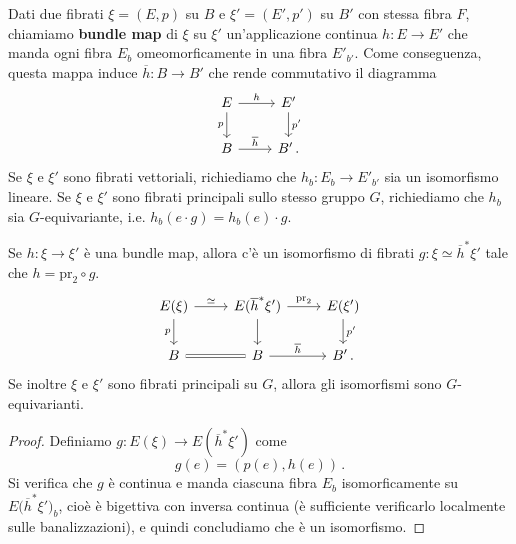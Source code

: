 
\begin{df}
	Dati due fibrati $\xi = (E,p)$ su $B$ e  $\xi'=(E',p')$ su $B'$ con stessa fibra $F$,
	chiamiamo \textbf{bundle map} di $\xi$ su $\xi'$ un'applicazione continua
	$h:E \to E'$ che manda ogni fibra $E_{b}$ omeomorficamente in una fibra $E'_{b'}$.
	Come conseguenza, questa mappa induce $\overline{h} : B \to B'$ che rende commutativo il diagramma
	\begin{equation*}
		\begin{tikzcd}
			E \ar[d, "p"'] \ar[r, "h"] & E' \ar[d, "p'"] \\
			B \ar[r, "\overline{h}"] & B'\,.
		\end{tikzcd}
	\end{equation*}
	Se $\xi$ e $\xi'$ sono fibrati vettoriali, richiediamo che
	$h_{b}:E_{b} \to E'_{b'}$ sia un isomorfismo lineare.
	Se $\xi$ e $\xi'$ sono fibrati principali sullo stesso gruppo $G$,
	richiediamo che $h_{b}$ sia $G$-equivariante, i.e. $h_{b}(e \cdot g) = h_{b}(e) \cdot g$.
\end{df}


\begin{prop}\label{bundle-map-pullback}
	Se $h:\xi \to \xi'$ è una bundle map,
	allora c'è un isomorfismo di fibrati $g:\xi \simeq \overline{h}^{*}\xi'$
	tale che $h=\mathrm{pr}_{2} \circ g$.
	\begin{equation*}
		\begin{tikzcd}
			E(\xi) \ar[r, "\simeq"] \ar[d, "p"']
			& E(\overline{h}^{*}\xi') \ar[r, "\mathrm{pr}_{2}"] \ar[d]
			& E(\xi') \ar[d, "p'"] \\
			B \ar[r, equals] 
			& B \ar[r, "\overline{h}"]
			& B'\,.
		\end{tikzcd}
	\end{equation*}
	Se inoltre $\xi$ e $\xi'$ sono fibrati principali su $G$,
	allora gli isomorfismi sono $G$-equivarianti.
	\begin{proof}
		Definiamo $g: E(\xi) \to E(\overline{h}^{*}\xi')$ come
		\begin{equation*}
			g(e) = \left( p(e), h(e) \right)\,.
		\end{equation*}
		Si verifica che $g$ è continua e manda ciascuna fibra $E_{b}$
		isomorficamente su %
		$E({\overline{h}^{*}\xi')_{b}}$,
		cioè è bigettiva con inversa continua (è sufficiente verificarlo
		localmente sulle banalizzazioni),
		e quindi concludiamo che è un isomorfismo.
	\end{proof}
\end{prop}

